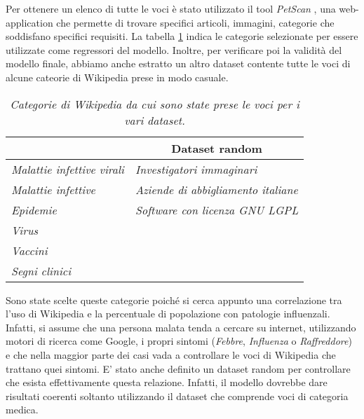 Per ottenere un elenco di tutte le voci è stato utilizzato il tool \textit{PetScan} \cite{PetScan}, una web-application che 
permette di trovare specifici articoli, immagini, categorie che soddisfano specifici requisiti. La tabella 
\ref{tab:ch_2_wikipedia_cat} indica le categorie selezionate per essere utilizzate come regressori del modello. Inoltre, per 
verificare poi la validità del modello finale, abbiamo anche estratto un altro dataset contente tutte le voci di alcune 
cateorie di Wikipedia prese in modo casuale.
\bigskip

\begin{table}[h]
\centering 
\begin{adjustbox}{max width=\textwidth}
\begin{tabular}{|l|l|}
\hline
\rowcolor[HTML]{EFEFEF} 
\multicolumn{1}{|c|}{\cellcolor[HTML]{EFEFEF}\textbf{Dataset principale}} & \multicolumn{1}{c|}{\cellcolor[HTML]{EFEFEF}\textbf{Dataset random}} \\ \hline
\textit{Malattie infettive virali}                                        & \textit{Investigatori immaginari}                                    \\ \hline
\textit{Malattie infettive}                                               & \textit{Aziende di abbigliamento italiane}                           \\ \hline
\textit{Epidemie}                                                         & \textit{Software con licenza GNU LGPL}                               \\ \hline
\textit{Virus}                                                            & \textit{}                                                            \\ \hline
\textit{Vaccini}                                                          & \textit{}                                                            \\ \hline
\textit{Segni clinici}                                                    & \textit{}                                                            \\ \hline
\end{tabular}
\end{adjustbox}
\caption{\textit{Categorie di Wikipedia da cui sono state prese le voci per i vari dataset.}}
\label{tab:ch_2_wikipedia_cat}
\end{table}

Sono state scelte queste categorie poiché si cerca appunto una correlazione tra l'uso di Wikipedia e la percentuale di 
popolazione con patologie influenzali. Infatti, si assume che una persona malata tenda a cercare su internet, utilizzando 
motori di ricerca come Google, i propri sintomi (\textit{Febbre}, \textit{Influenza} o \textit{Raffreddore}) e che nella 
maggior parte dei casi vada a controllare le voci di Wikipedia che trattano quei sintomi. E' stato anche definito un dataset 
random per controllare che esista effettivamente questa relazione. Infatti, il modello dovrebbe dare risultati coerenti 
soltanto utilizzando il dataset che comprende voci di categoria medica. 
\bigskip 


